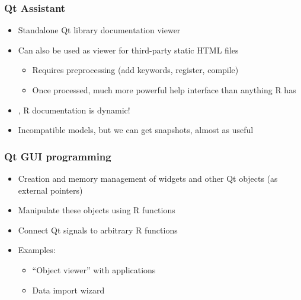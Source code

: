 \documentclass[compress]{beamer}
\begin{document}
\begin{frame}
  \frametitle{Qt Assistant}
  \begin{itemize}
  \item Standalone Qt library documentation viewer
  \item Can also be used as viewer for third-party static HTML files
    \begin{itemize}
    \item Requires preprocessing (add keywords, register, compile)
    \item Once processed, much more powerful help interface than anything R has
    \end{itemize}
  \item {}, R documentation is dynamic!
  \item Incompatible models, but we can get snapshots, almost as useful
  \end{itemize}
\end{frame}



 
 
 


\begin{frame}
  \frametitle{Qt GUI programming}
  \begin{itemize}
  \item Creation and memory management of widgets and other Qt objects
    (as external pointers)
  \item Manipulate these objects using R functions
  \item Connect Qt signals to arbitrary R functions
  \item Examples:
    \begin{itemize}
    \item ``Object viewer'' with applications
    \item Data import wizard
    \end{itemize}
  \end{itemize}
\end{frame}
\end{document}
